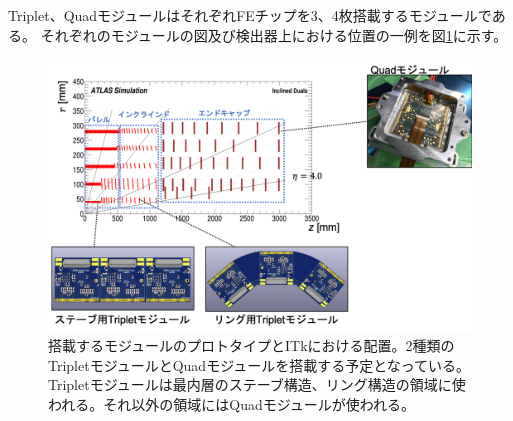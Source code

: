 Triplet、QuadモジュールはそれぞれFEチップを3、4枚搭載するモジュールである。
それぞれのモジュールの図及び検出器上における位置の一例を図\ref{module_geom}に示す。

\begin{figure}[bpt]\centering
\includegraphics[width=12cm]{./module_geom.png}
\caption[搭載するモジュールのプロトタイプとITkにおける配置。]{搭載するモジュールのプロトタイプとITkにおける配置。2種類のTripletモジュールとQuadモジュールを搭載する予定となっている。Tripletモジュールは最内層のステーブ構造、リング構造の領域に使われる。それ以外の領域にはQuadモジュールが使われる。}
\label{module_geom}
\end{figure}


